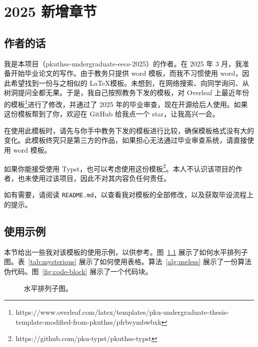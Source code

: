 
\chapter{2025 新增章节}
\label{chap:new-chapter}

\section{作者的话}

我是本项目（pkuthss-undergraduate-eecs-2025）的作者。在 2025 年 3 月，我准备开始毕业论文的写作。由于教务只提供 word 模板，而我不习惯使用 word，因此希望找到一份与之相似的 \LaTeX 模板。未想到，在网络搜索、向同学询问、从树洞提问全都无果。于是，我自己按照教务下发的模板，对 Overleaf 上最近年份的模板\footnote{https://www.overleaf.com/latex/templates/pku-undergraduate-thesis-template-modified-from-pkuthss/pfrbvymbwbxk}进行了修改，并通过了 2025 年的毕业审查，现在开源给后人使用。如果这份模板帮到了你，欢迎在 GitHub 给我点一个 star，让我高兴一会。

在使用此模板时，请先与你手中教务下发的模板进行比较，确保模板格式没有大的变化。此模板终究只是第三方的作品，如果担心无法通过毕业审查系统，请直接使用 word 模板。

如果你能接受使用 Typst，也可以考虑使用这份模板\footnote{https://github.com/pku-typst/pkuthss-typst}。本人不认识该项目的作者，也未使用过该项目，因此不对其内容负任何责任。

如有需要，请阅读 \texttt{README.md}，以查看我对模板的全部修改，以及获取毕设流程上的提示。

\section{使用示例}

本节给出一些我对该模板的使用示例，以供参考。图~\ref{fig:horizontal-subfig} 展示了如何水平排列子图。表~\ref{tab:mysterious} 展示了如何使用表格。算法~\ref{alg:useless} 展示了一份算法伪代码。图~\ref{fig:code-block} 展示了一个代码块。

\begin{figure}[ht]
\centering
{} %
\caption{水平排列子图。}
\label{fig:horizontal-subfig}
\end{figure}

